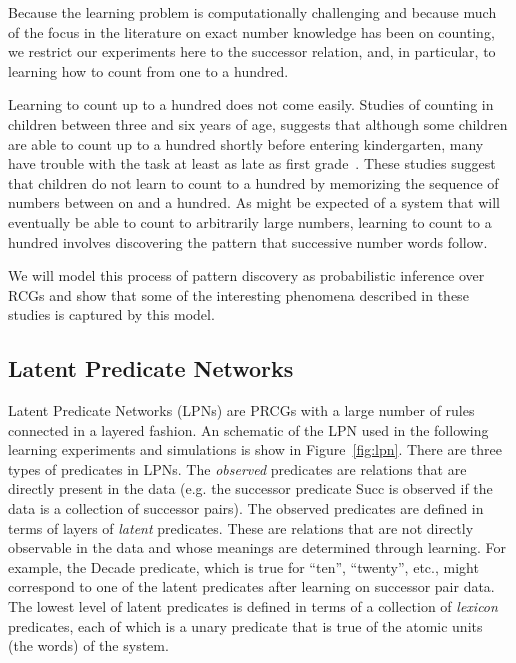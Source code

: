 \documentclass[10pt,letterpaper]{article}
\begin{document}
Because the learning problem is computationally challenging and
because much of the focus in the literature on exact number knowledge
has been on counting, we restrict our experiments here to the
successor relation, and, in particular, to learning how to count from
one to a hundred.

Learning to count up to a hundred does not come easily. Studies of
counting in children between three and six years of age, suggests that
although some children are able to count up to a hundred shortly
before entering kindergarten, many have trouble with the task at least
as late as first
grade~\cite{FusRicBriar1982,miller1987counting}. These studies suggest
that children do not learn to count to a hundred by memorizing the
sequence of numbers between on and a hundred. As might be expected of
a system that will eventually be able to count to arbitrarily large
numbers, learning to count to a hundred involves discovering the
pattern that successive number words follow. 

We will model this process of pattern discovery as probabilistic
inference over RCGs and show that some of the interesting phenomena
described in these studies is captured by this model. 

\subsection{Latent Predicate Networks}
Latent Predicate Networks (LPNs) are PRCGs with a large number of
rules connected in a layered fashion. An schematic of the LPN used in
the following learning experiments and simulations is show in
Figure~\ref{fig:lpn}. There are three types of predicates in LPNs. The
\emph{observed} predicates are relations that are directly present in
the data (e.g. the successor predicate Succ is observed if the data is
a collection of successor pairs). The observed predicates are defined
in terms of layers of \emph{latent} predicates. These are relations
that are not directly observable in the data and whose meanings are
determined through learning. For example, the Decade predicate, which
is true for ``ten'', ``twenty'', etc., might correspond to one of the
latent predicates after learning on successor pair data. The lowest
level of latent predicates is defined in terms of a collection of
\emph{lexicon} predicates, each of which is a unary predicate that is
true of the atomic units (the words) of the system.
\end{document}

